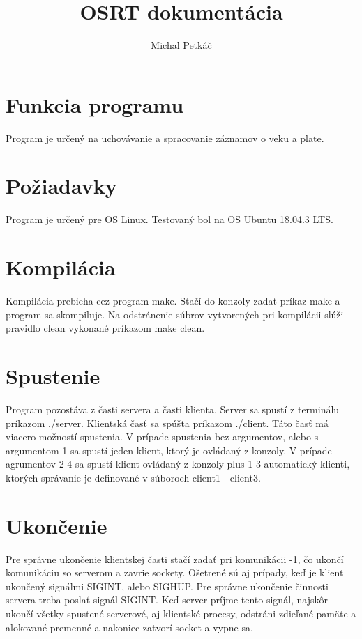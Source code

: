 \documentclass{article}
\title{OSRT dokumentácia}
\author{Michal Petkáč}
\begin{document}
\maketitle
\section{Funkcia programu}
Program je určený na uchovávanie a spracovanie záznamov o veku a plate.

\section{Požiadavky}
Program je určený pre OS Linux. Testovaný bol na OS Ubuntu 18.04.3 LTS. 

\section{Kompilácia}
Kompilácia prebieha cez program make. Stačí do konzoly zadať príkaz make a program sa skompiluje.
Na odstránenie súbrov vytvorených pri kompilácii slúži pravidlo clean vykonané príkazom make clean.

\section{Spustenie}
Program pozostáva z časti servera a časti klienta. Server sa spustí z terminálu príkazom ./server. 
\newline
Klientská časť sa spúšta príkazom ./client. Táto časť má viacero možností spustenia. V prípade
spustenia bez argumentov, alebo s argumentom 1 sa spustí jeden klient, ktorý je ovládaný z konzoly.
V prípade agrumentov 2-4 sa spustí klient ovládaný z konzoly plus 1-3 automatický klienti, ktorých
správanie je definované v súboroch client1 - client3.

\section{Ukončenie}
Pre správne ukončenie klientskej časti stačí zadať pri komunikácii -1, čo ukončí komunikáciu so
serverom a zavrie sockety. Ošetrené sú aj prípady, keď je klient ukončený signálmi SIGINT, alebo
SIGHUP.
\newline
Pre správne ukončenie činnosti servera treba poslať signál SIGINT. Keď server príjme tento signál,
najskôr ukončí všetky spustené serverové, aj klientské procesy, odstráni zdieľané pamäte a
alokované premenné a nakoniec zatvorí socket a vypne sa.
\end{document}
